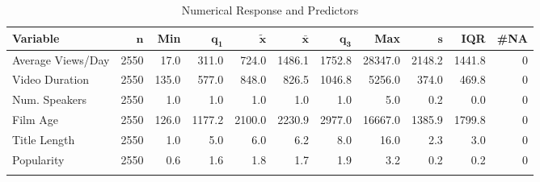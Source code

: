 \begingroup\footnotesize
\begin{longtable}{lrrrrrrrrrr}
 \textbf{Variable} & $\mathbf{n}$ & \textbf{Min} & $\mathbf{q_1}$ & $\mathbf{\widetilde{x}}$ & $\mathbf{\bar{x}}$ & $\mathbf{q_3}$ & \textbf{Max} & $\mathbf{s}$ & \textbf{IQR} & \textbf{\#NA} \\ 
  \hline
Average Views/Day & 2550 &  17.0 &  311.0 &  724.0 & 1486.1 & 1752.8 & 28347.0 & 2148.2 & 1441.8 & 0 \\ 
  Video Duration & 2550 & 135.0 &  577.0 &  848.0 &  826.5 & 1046.8 &  5256.0 &  374.0 &  469.8 & 0 \\ 
  Num. Speakers & 2550 &   1.0 &    1.0 &    1.0 &    1.0 &    1.0 &     5.0 &    0.2 &    0.0 & 0 \\ 
  Film Age & 2550 & 126.0 & 1177.2 & 2100.0 & 2230.9 & 2977.0 & 16667.0 & 1385.9 & 1799.8 & 0 \\ 
  Title Length & 2550 &   1.0 &    5.0 &    6.0 &    6.2 &    8.0 &    16.0 &    2.3 &    3.0 & 0 \\ 
  Popularity & 2550 &   0.6 &    1.6 &    1.8 &    1.7 &    1.9 &     3.2 &    0.2 &    0.2 & 0 \\ 
  \hline
\caption{Numerical Response and Predictors} 
\label{numer}
\end{longtable}
\endgroup
